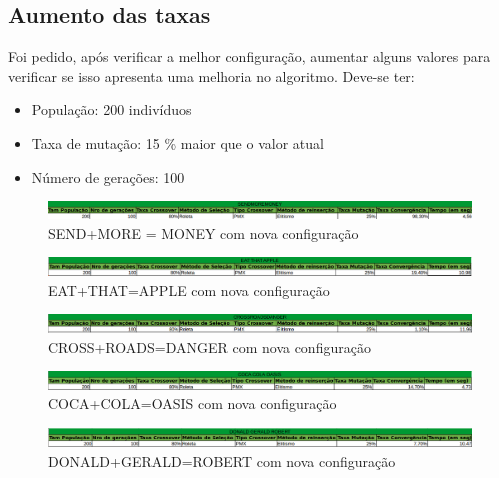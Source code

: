 \documentclass[hidelinks,12pt]{article}
\begin{document}
	\subsection{Aumento das taxas}
	
	
	Foi pedido, após verificar a melhor configuração, aumentar alguns valores para verificar se isso apresenta uma melhoria no algoritmo. Deve-se ter:
	\begin{itemize}
    \item População: 200 indivíduos
    
	\item Taxa de mutação: 15 \% maior que o valor atual
	
	\item Número de gerações: 100
	\end{itemize}
	\newpage
	\begin{figure}[h!]
		\centering
		\includegraphics[scale=0.42]{Figures/aprimorandosendmoremoney}
		\caption{SEND+MORE = MONEY com nova configuração}
	\end{figure}
	
	\begin{figure}[h!]
		\centering
		\includegraphics[scale=0.42]{Figures/aprimorandoeatthatapple}
		\caption{EAT+THAT=APPLE com nova configuração}
	\end{figure}
	
	\begin{figure}[h!]
		\centering
		\includegraphics[scale=0.42]{Figures/aprimorandocrossroadsdanger}
		\caption{CROSS+ROADS=DANGER com nova configuração}
	\end{figure}
	
	
	\begin{figure}[h!]
		\centering
		\includegraphics[scale=0.42]{Figures/aprimorandococacolaoasis}
		\caption{COCA+COLA=OASIS com nova configuração}
	\end{figure}
		
	\begin{figure}[h!]
		\centering
		\includegraphics[scale=0.42]{Figures/aprimorandodonaldgeraldrobert}
		\caption{DONALD+GERALD=ROBERT com nova configuração}
	\end{figure}
\end{document}
